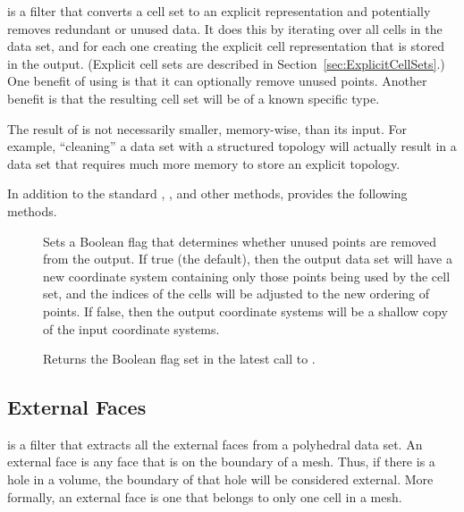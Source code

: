  is a filter that converts a cell set to an explicit representation and potentially removes redundant or unused data.
It does this by iterating over all cells in the data set, and for each one creating the explicit cell representation that is stored in the output.
(Explicit cell sets are described in Section~\ref{sec:ExplicitCellSets}.)
One benefit of using  is that it can optionally remove unused points.
Another benefit is that the resulting cell set will be of a known specific type.

\begin{commonerrors}
  The result of  is not necessarily smaller, memory-wise, than its input.
  For example, ``cleaning'' a data set with a structured topology will actually result in a data set that requires much more memory to store an explicit topology.
\end{commonerrors}

In addition to the standard ,
, and other methods,
 provides the following methods.

\begin{description}
\item[]
  Sets a Boolean flag that determines whether unused points are removed from the output.
  If true (the default), then the output data set will have a new coordinate system containing only those points being used by the cell set, and the indices of the cells will be adjusted to the new ordering of points.
  If false, then the output coordinate systems will be a shallow copy of the input coordinate systems.
\item[]
  Returns the Boolean flag set in the latest call to .
\end{description}


\subsection{External Faces}


 is a filter that extracts all the external faces
from a polyhedral data set. An external face is any face that is on the
boundary of a mesh. Thus, if there is a hole in a volume, the boundary of
that hole will be considered external. More formally, an external face is
one that belongs to only one cell in a mesh.

